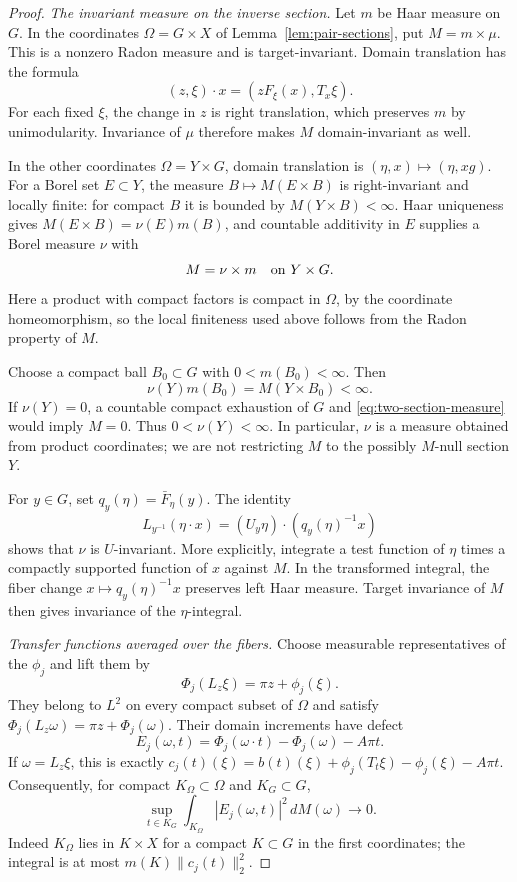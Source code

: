 \begin{proof}
\emph{The invariant measure on the inverse section.}
Let $m$ be Haar measure on $G$.  In the coordinates $\Omega=G\times X$
of Lemma~\ref{lem:pair-sections}, put $M=m\times\mu$.
This is a nonzero Radon measure and is target-invariant.  Domain
translation has the formula
\[
 (z,\xi)\cdot x=(zF_\xi(x),T_x\xi).
\]
For each fixed $\xi$, the change in $z$ is right translation,
which preserves $m$ by unimodularity.  Invariance of $\mu$ therefore
makes $M$ domain-invariant as well.

In the other coordinates $\Omega=Y\times G$, domain translation is
$(\eta,x)\mapsto(\eta,xg)$.  For a Borel set $E\subset Y$, the
measure $B\mapsto M(E\times B)$ is right-invariant and locally
finite: for compact $B$ it is bounded by $M(Y\times B)<\infty$.
Haar uniqueness gives $M(E\times B)=\nu(E)m(B)$, and countable
additivity in $E$ supplies a Borel measure $\nu$ with
\begin{equation}\label{eq:two-section-measure}
 M=\nu\times m\quad\hbox{on }Y\times G.
\end{equation}
Here a product with compact factors is compact in $\Omega$, by the
coordinate homeomorphism, so the local finiteness used above follows
from the Radon property of $M$.

Choose a compact ball $B_0\subset G$ with $0<m(B_0)<\infty$.
Then
\[
 \nu(Y)m(B_0)=M(Y\times B_0)<\infty.
\]
If $\nu(Y)=0$, a countable compact exhaustion of $G$ and
\eqref{eq:two-section-measure} would imply $M=0$.
Thus $0<\nu(Y)<\infty$.  In particular, $\nu$ is a measure obtained
from product coordinates; we are not restricting $M$ to the
possibly $M$-null section $Y$.

For $y\in G$, set $q_y(\eta)=\bar F_\eta(y)$.  The identity
\begin{equation}\label{eq:coupling-target-action}
 L_{y^{-1}}(\eta\cdot x)
   =(U_y\eta)\cdot(q_y(\eta)^{-1}x)
\end{equation}
shows that $\nu$ is $U$-invariant.  More explicitly, integrate a
test function of $\eta$ times a compactly supported function of $x$
against $M$.  In the transformed integral, the fiber change
$x\mapsto q_y(\eta)^{-1}x$ preserves left Haar measure.
Target invariance of $M$ then gives invariance of the $\eta$-integral.

\emph{Transfer functions averaged over the fibers.}
Choose measurable representatives of the $\phi_j$ and lift them by
\[
 \Phi_j(L_z\xi)=\pi z+\phi_j(\xi).
\]
They belong to $L^2$ on every compact subset of $\Omega$ and satisfy
$\Phi_j(L_z\omega)=\pi z+\Phi_j(\omega)$.
Their domain increments have defect
\[
 E_j(\omega,t)=\Phi_j(\omega\cdot t)-\Phi_j(\omega)-A\pi t.
\]
If $\omega=L_z\xi$, this is exactly
$c_j(t)(\xi)=b(t)(\xi)+\phi_j(T_t\xi)-\phi_j(\xi)-A\pi t$.
Consequently, for compact $K_\Omega\subset\Omega$ and
$K_G\subset G$,
\begin{equation}\label{eq:local-increment-defect}
 \sup_{t\in K_G}\int_{K_\Omega}|E_j(\omega,t)|^2\,dM(\omega)
 \longrightarrow0.
\end{equation}
Indeed $K_\Omega$ lies in $K\times X$ for a compact $K\subset G$
in the first coordinates; the integral is at most
$m(K)\|c_j(t)\|_2^2$.


\end{proof}
